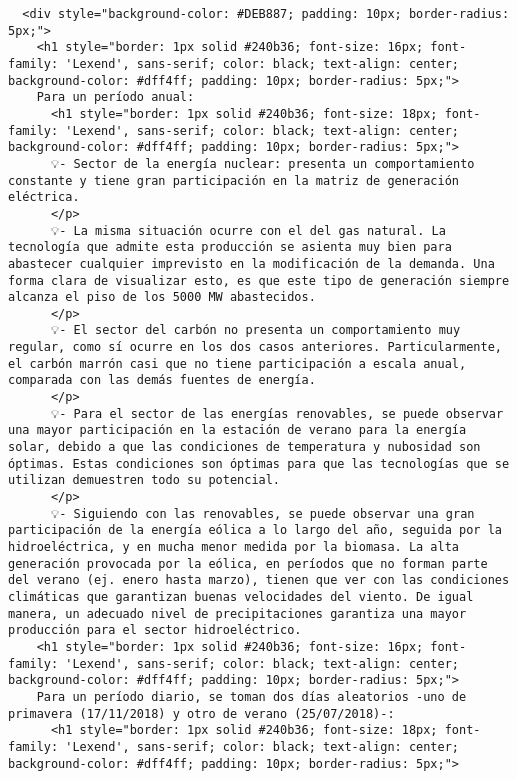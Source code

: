 \documentclass[11pt]{article}
\begin{document}
    
    \begin{verbatim}
  <div style="background-color: #DEB887; padding: 10px; border-radius: 5px;">
    <h1 style="border: 1px solid #240b36; font-size: 16px; font-family: 'Lexend', sans-serif; color: black; text-align: center; background-color: #dff4ff; padding: 10px; border-radius: 5px;">
    Para un período anual:
      <h1 style="border: 1px solid #240b36; font-size: 18px; font-family: 'Lexend', sans-serif; color: black; text-align: center; background-color: #dff4ff; padding: 10px; border-radius: 5px;">
      💡- Sector de la energía nuclear: presenta un comportamiento constante y tiene gran participación en la matriz de generación eléctrica.
      </p>
      💡- La misma situación ocurre con el del gas natural. La tecnología que admite esta producción se asienta muy bien para abastecer cualquier imprevisto en la modificación de la demanda. Una forma clara de visualizar esto, es que este tipo de generación siempre alcanza el piso de los 5000 MW abastecidos.
      </p>
      💡- El sector del carbón no presenta un comportamiento muy regular, como sí ocurre en los dos casos anteriores. Particularmente, el carbón marrón casi que no tiene participación a escala anual, comparada con las demás fuentes de energía.
      </p>
      💡- Para el sector de las energías renovables, se puede observar una mayor participación en la estación de verano para la energía solar, debido a que las condiciones de temperatura y nubosidad son óptimas. Estas condiciones son óptimas para que las tecnologías que se utilizan demuestren todo su potencial.
      </p>
      💡- Siguiendo con las renovables, se puede observar una gran participación de la energía eólica a lo largo del año, seguida por la hidroeléctrica, y en mucha menor medida por la biomasa. La alta generación provocada por la eólica, en períodos que no forman parte del verano (ej. enero hasta marzo), tienen que ver con las condiciones climáticas que garantizan buenas velocidades del viento. De igual manera, un adecuado nivel de precipitaciones garantiza una mayor producción para el sector hidroeléctrico.
    <h1 style="border: 1px solid #240b36; font-size: 16px; font-family: 'Lexend', sans-serif; color: black; text-align: center; background-color: #dff4ff; padding: 10px; border-radius: 5px;">
    Para un período diario, se toman dos días aleatorios -uno de primavera (17/11/2018) y otro de verano (25/07/2018)-:
      <h1 style="border: 1px solid #240b36; font-size: 18px; font-family: 'Lexend', sans-serif; color: black; text-align: center; background-color: #dff4ff; padding: 10px; border-radius: 5px;">

\end{verbatim}
\end{document}
